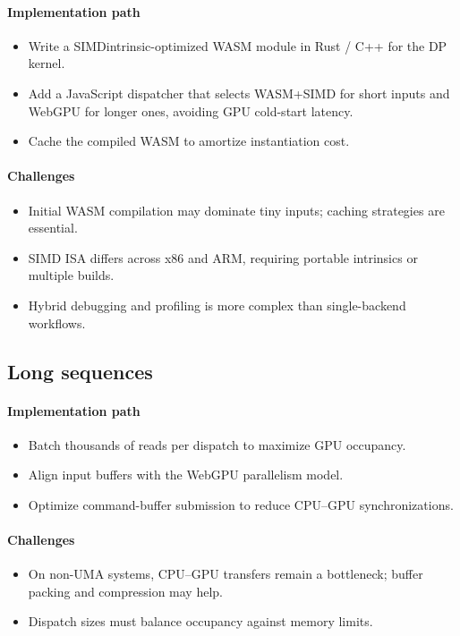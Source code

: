 \documentclass[PhD]{PHlab-thesis}
\begin{document}
\paragraph{Implementation path}
\begin{itemize}
  \item Write a SIMDintrinsic-optimized WASM module in Rust / C++ for the DP kernel.
  \item Add a JavaScript dispatcher that selects WASM+SIMD for short inputs and WebGPU for longer ones, avoiding GPU cold-start latency.
  \item Cache the compiled WASM to amortize instantiation cost.
\end{itemize}

\paragraph{Challenges}
\begin{itemize}
  \item Initial WASM compilation may dominate tiny inputs; caching strategies are essential.
  \item SIMD ISA differs across x86 and ARM, requiring portable intrinsics or multiple builds.
  \item Hybrid debugging and profiling is more complex than single-backend workflows.
\end{itemize}

\subsection{Long sequences}

\paragraph{Implementation path}
\begin{itemize}
  \item Batch thousands of reads per dispatch to maximize GPU occupancy.
  \item Align input buffers with the WebGPU parallelism model.
  \item Optimize command-buffer submission to reduce CPU–GPU synchronizations.
\end{itemize}

\paragraph{Challenges}
\begin{itemize}
  \item On non-UMA systems, CPU–GPU transfers remain a bottleneck; buffer packing and compression may help.
  \item Dispatch sizes must balance occupancy against memory limits.
\end{itemize}
\end{document}
